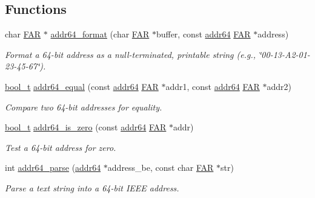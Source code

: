 \subsection*{Functions}
\begin{DoxyCompactItemize}
\item 
char \hyperlink{group__hal_gaef060b3456fdcc093a7210a762d5f2ed}{F\-A\-R} $\ast$ \hyperlink{group__wpan__types_ga448782f4aed0821758969b47221417ed}{addr64\-\_\-format} (char \hyperlink{group__hal_gaef060b3456fdcc093a7210a762d5f2ed}{F\-A\-R} $\ast$buffer, const \hyperlink{unionaddr64}{addr64} \hyperlink{group__hal_gaef060b3456fdcc093a7210a762d5f2ed}{F\-A\-R} $\ast$address)
\begin{DoxyCompactList}\small\item\em Format a 64-\/bit address as a null-\/terminated, printable string (e.\-g., \char`\"{}00-\/13-\/\-A2-\/01-\/23-\/45-\/67\char`\"{}). \end{DoxyCompactList}\item 
\hyperlink{group__hal_ga04dd5074964518403bf944f2b240a5f8}{bool\-\_\-t} \hyperlink{group__wpan__types_ga2f0706c06dc9bdcb918b55635dcd9b6f}{addr64\-\_\-equal} (const \hyperlink{unionaddr64}{addr64} \hyperlink{group__hal_gaef060b3456fdcc093a7210a762d5f2ed}{F\-A\-R} $\ast$addr1, const \hyperlink{unionaddr64}{addr64} \hyperlink{group__hal_gaef060b3456fdcc093a7210a762d5f2ed}{F\-A\-R} $\ast$addr2)
\begin{DoxyCompactList}\small\item\em Compare two 64-\/bit addresses for equality. \end{DoxyCompactList}\item 
\hyperlink{group__hal_ga04dd5074964518403bf944f2b240a5f8}{bool\-\_\-t} \hyperlink{group__wpan__types_ga9795dea7f415ceb7502f39a78ebadfc1}{addr64\-\_\-is\-\_\-zero} (const \hyperlink{unionaddr64}{addr64} \hyperlink{group__hal_gaef060b3456fdcc093a7210a762d5f2ed}{F\-A\-R} $\ast$addr)
\begin{DoxyCompactList}\small\item\em Test a 64-\/bit address for zero. \end{DoxyCompactList}\item 
int \hyperlink{group__wpan__types_ga500b175732df9779b3670e2ba1402530}{addr64\-\_\-parse} (\hyperlink{unionaddr64}{addr64} $\ast$address\-\_\-be, const char \hyperlink{group__hal_gaef060b3456fdcc093a7210a762d5f2ed}{F\-A\-R} $\ast$str)
\begin{DoxyCompactList}\small\item\em Parse a text string into a 64-\/bit I\-E\-E\-E address. \end{DoxyCompactList}\end{DoxyCompactItemize}
